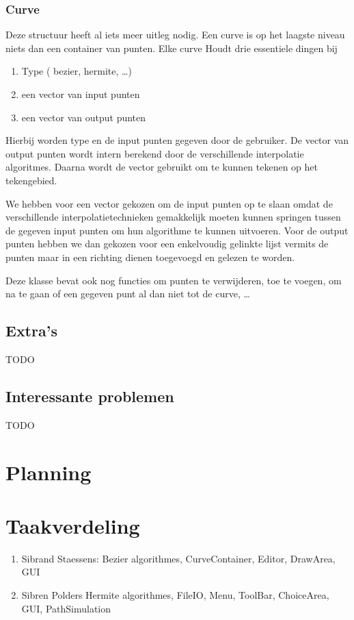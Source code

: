 \documentclass[a4paper,11pt,oneside, titlepage]{article}
\begin{document}
\subsubsection{Curve}
Deze structuur heeft al iets meer uitleg nodig. Een curve is op het laagste niveau niets dan
een container van punten.\newline
Elke curve Houdt drie essentiele dingen bij
\begin{enumerate}
\item Type ( bezier, hermite, \ldots )
\item een vector van input punten
\item een vector van output punten
\end{enumerate}

Hierbij worden type en de input punten gegeven door de gebruiker. De vector van output punten
wordt intern berekend door de verschillende interpolatie algoritmes. Daarna wordt de vector
gebruikt om te kunnen tekenen op het tekengebied.\newline

We hebben voor een vector gekozen om de input punten op te slaan omdat de verschillende
interpolatietechnieken gemakkelijk moeten kunnen springen tussen de gegeven input punten om
hun algorithme te kunnen uitvoeren. Voor de output punten hebben we dan gekozen voor een 
enkelvoudig gelinkte lijst vermits de punten maar in een richting dienen toegevoegd en gelezen
te worden.

Deze klasse bevat ook nog functies om punten te verwijderen, toe te voegen, om na te gaan of een gegeven punt al dan niet tot de curve, \ldots
\subsection{Extra's}
TODO
\subsection{Interessante problemen}
TODO
\newpage
\section{Planning}
\newpage
\section{Taakverdeling}
\begin{enumerate}
\item Sibrand Staessens:
       Bezier algorithmes, CurveContainer, Editor, DrawArea, GUI
\item Sibren Polders
       Hermite algorithmes, FileIO, Menu, ToolBar, ChoiceArea, GUI, PathSimulation
\end{enumerate}
\newpage
\end{document}
